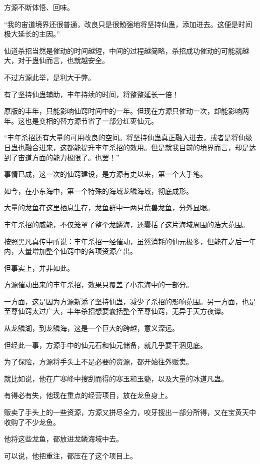 \begin{this_body}
方源不断体悟、回味。

“我的宙道境界还很普通，改良只是很勉强地将坚持仙蛊，添加进去。这便是时间极大延长的主因。”

仙道杀招当然是催动的时间越短，中间的过程越简略，杀招成功催动的可能就越大，对于蛊仙而言，也就越安全。

不过方源此举，是利大于弊。

有了坚持仙蛊辅助，丰年持续的时间，将整整延长一倍！

原版的丰年，只能影响仙窍时间中的一年。但现在方源只催动一次，却能影响两年。这也是变相的替方源节省了一部分红枣仙元。

“丰年杀招还有大量的可用改良的空间。将坚持仙蛊真正融入进去，或者是将仙级日蛊也融合进来，这都能提升丰年杀招的效用。但是就我目前的境界而言，却是达到了宙道方面的能力极限了。也罢！”

事情已成，这一次的仙窍建设，是方源有史以来，第一个大手笔。

如今，在小东海中，第一个特殊的海域龙鳞海域，彻底成形。

大量的龙鱼在这里栖息生存，龙鱼群中一两只荒兽龙鱼，分外显眼。

丰年杀招的威能，不仅笼罩了整个龙鳞海，还囊括了这片海域周围的浩大范围。

按照黑凡真传中所说：丰年杀招一经催动，虽然消耗的仙元极多，但能在之后一年内，大量增加整个仙窍中的各项资源产出。

但事实上，并非如此。

方源催动出来的丰年杀招，效果只覆盖了小东海中的一部分。

一方面，这是因为方源新添了坚持仙蛊，减少了杀招的影响范围。另一方面，也是至尊仙窍太过广大，丰年杀招想要囊括整个至尊仙窍，无异于天方夜谭。

从龙鳞湖，到龙鳞海，这是一个巨大的跨越，意义深远。

但经此一事，方源手中的仙元石和仙元储备，就几乎要干涸见底。

为了保险，方源将手头上不是必要的资源，都开始往外贩卖。

就比如说，他在广寒峰中搜刮而得的寒玉和玉髓，以及大量的冰道凡蛊。

有得必有失，他现在重点的经营项目，放在龙鱼身上。

贩卖了手头上的一些资源，方源又拼尽全力，咬牙搜出一部分所得，又在宝黄天中收购了不少龙鱼。

他将这些龙鱼，都放进龙鳞海域中去。

可以说，他把重注，都压在了这个项目上。


\end{this_body}
